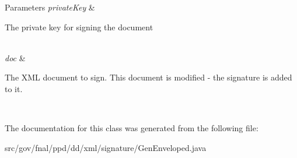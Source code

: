\begin{DoxyParams}{Parameters}
{\em private\-Key} & 
\begin{DoxyItemize}
\item The private key for signing the document 
\end{DoxyItemize}\\
\hline
{\em doc} & 
\begin{DoxyItemize}
\item The X\-M\-L document to sign. This document is modified -\/ the signature is added to it. 
\end{DoxyItemize}\\
\hline
\end{DoxyParams}


The documentation for this class was generated from the following file\-:\begin{DoxyCompactItemize}
\item 
src/gov/fnal/ppd/dd/xml/signature/Gen\-Enveloped.\-java\end{DoxyCompactItemize}
